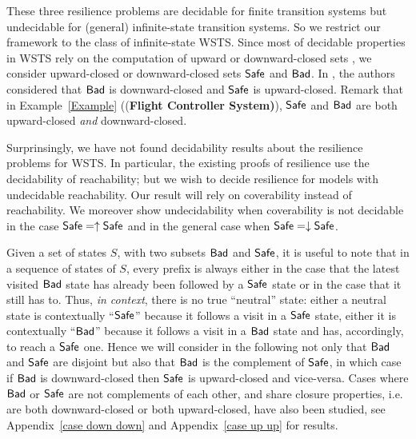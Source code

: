   
These three resilience problems are decidable for finite transition systems but undecidable for (general) infinite-state transition systems. So we restrict our framework to the class of infinite-state WSTS. Since most of decidable properties in WSTS rely on the computation of upward or downward-closed sets \cite{DBLP:journals/iandc/AbdullaCJT00, DBLP:journals/tcs/FinkelS01}, we consider upward-closed or downward-closed sets $\textsf{Safe}$ and $\textsf{Bad}$. In \cite{DBLP:journals/corr/abs-2108-00889}, the authors considered that $\textsf{Bad}$ is downward-closed and $\textsf{Safe}$ is upward-closed. %
Remark that in Example~\ref{Example} ({(\bf Flight Controller System)}), $\textsf{Safe}$ and $\textsf{Bad}$ are both upward-closed \emph{and} downward-closed.

Surprinsingly, we have not found decidability results about the resilience problems for WSTS.	
In particular, the existing proofs of resilience use the decidability of reachability;
 but we wish to decide resilience for models with undecidable reachability.
Our result will rely on coverability instead of reachability. We moreover show undecidability when coverability is not decidable in the case $\textsf{Safe} = \uparrow \textsf{Safe}$
and in the general case when $\textsf{Safe} = \downarrow \textsf{Safe}$.
 





Given a set of states $S$, with two subsets $\textsf{Bad}$ and $\textsf{Safe}$, it is useful to note that in a sequence of states of $S$, every prefix is always 
either in the case that the latest visited $\textsf{Bad}$ state has already been followed by a 
$\textsf{Safe}$ state
or in the case that it still has to. 
Thus, \emph{in context}, there is no true ``neutral'' state: either a neutral state is contextually ``$\textsf{Safe}$'' because it follows a visit in a $\textsf{Safe}$ state, either it is contextually ``$\textsf{Bad}$'' because it follows a visit in a $\textsf{Bad}$ state and has, accordingly, to reach a $\textsf{Safe}$ one.
Hence we will consider in the following not only that $\textsf{Bad}$ and $\textsf{Safe}$ are disjoint but
	also
that $\textsf{Bad}$ is the complement of $\textsf{Safe}$,
in which case
if $\textsf{Bad}$ is downward-closed then $\textsf{Safe}$ is upward-closed and vice-versa.
Cases where $\textsf{Bad}$ or $\textsf{Safe}$ are not complements of each other, and share closure properties, i.e. are both downward-closed or both upward-closed,
have also been studied, 
see 
Appendix~\ref{case down down}
and
Appendix~\ref{case up up} for results.


